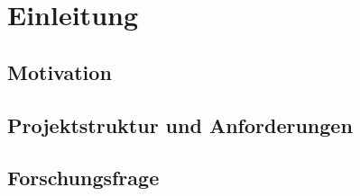 \newpage


\section{Einleitung}

\subsection{Motivation}

\subsection{Projektstruktur und Anforderungen}

\subsection{Forschungsfrage}
